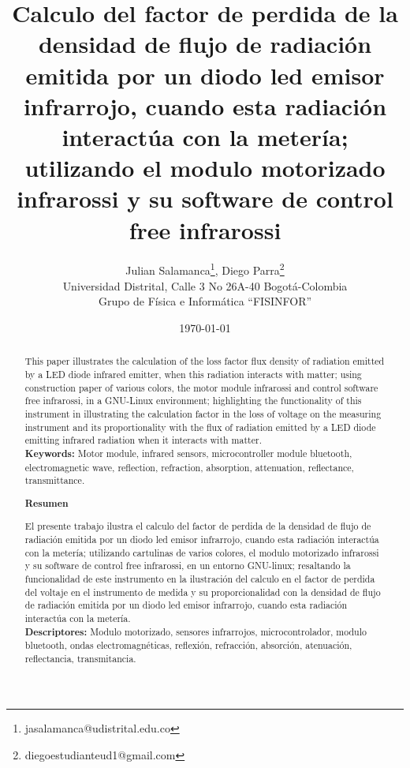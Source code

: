 \documentclass[12]{article}
\title{\bf{Calculo del factor de perdida de la densidad de flujo de radiación emitida por un diodo led emisor infrarrojo, cuando esta radiación interactúa con la metería; utilizando el modulo motorizado infrarossi y su software de control free infrarossi}}
\author{Julian Salamanca\footnote{jasalamanca@udistrital.edu.co}, Diego Parra\footnote{diegoestudianteud1@gmail.com} \\
  Universidad Distrital, Calle 3 No 26A-40 Bogotá-Colombia\\
  Grupo de Física e Informática ``FISINFOR''
}
\date{\today}
\def\tablename{Tabla}%
\begin{document}
\renewcommand{\tablename}{Tabla}
\maketitle
\vspace{-0.8cm}
\begin{abstract}
This paper illustrates the calculation of the loss factor flux density of radiation emitted by a LED diode infrared emitter, when this radiation interacts with matter; using construction paper of various colors, the motor module infrarossi  and control software free infrarossi,  in a GNU-Linux environment; highlighting the functionality of this instrument in illustrating the calculation factor in the loss of voltage on the measuring instrument and its proportionality with the flux of radiation emitted by a LED diode emitting infrared radiation when it interacts with matter.\\
{\bf{Keywords:}} Motor module, infrared sensors, microcontroller module bluetooth, electromagnetic wave, reflection, refraction, absorption, attenuation, reflectance, transmittance.
\begin{center}
{\bf{Resumen}} 
\end{center}
El presente trabajo ilustra el calculo del factor de perdida de la densidad de flujo de radiación emitida por un diodo led emisor infrarrojo, cuando esta radiación interactúa con la metería; utilizando cartulinas de varios colores, el modulo motorizado  infrarossi y su software de control free infrarossi, en un entorno GNU-linux; resaltando la funcionalidad de este instrumento en la ilustración del calculo en el  factor de perdida del voltaje en el instrumento de medida y su proporcionalidad con  la densidad de flujo de radiación emitida por un diodo led emisor infrarrojo, cuando esta radiación interactúa con la metería.
\\
{\bf{Descriptores:}} Modulo motorizado, sensores infrarrojos, microcontrolador, modulo bluetooth, ondas electromagnéticas, reflexión, refracción, absorción, atenuación, reflectancia, transmitancia.
\end{abstract}
\end{document}
